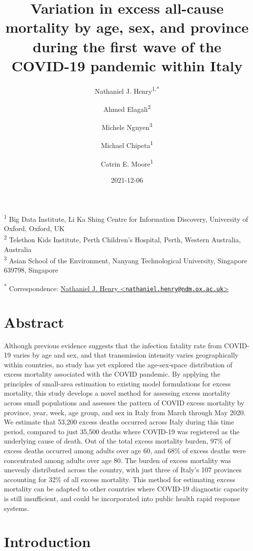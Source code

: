 \documentclass[
]{article}
\title{Variation in excess all-cause mortality by age, sex, and province during the first wave of the COVID-19 pandemic within Italy}
\author{Nathaniel J. Henry\textsuperscript{1,*} \and Ahmed Elagali\textsuperscript{2} \and Michele Nguyen\textsuperscript{3} \and Michael Chipeta\textsuperscript{1} \and Catrin E. Moore\textsuperscript{1}}
\date{2021-12-06}
\begin{document}
\maketitle

\textsuperscript{1} Big Data Institute, Li Ka Shing Centre for Information Discovery, University of Oxford, Oxford, UK\\
\textsuperscript{2} Telethon Kids Institute, Perth Children's Hospital, Perth, Western Australia, Australia\\
\textsuperscript{3} Asian School of the Environment, Nanyang Technological University, Singapore 639798, Singapore

\textsuperscript{*} Correspondence: \href{mailto:nathaniel.henry@ndm.ox.ac.uk}{Nathaniel J. Henry \textless{}\href{mailto:nathaniel.henry@ndm.ox.ac.uk}{\nolinkurl{nathaniel.henry@ndm.ox.ac.uk}}\textgreater{}}

\hypertarget{abstract}{%
\section{Abstract}\label{abstract}}

Although previous evidence suggests that the infection fatality rate from COVID-19 varies by age and sex, and that transmission intensity varies geographically within countries, no study has yet explored the age-sex-space distribution of excess mortality associated with the COVID pandemic. By applying the principles of small-area estimation to existing model formulations for excess mortality, this study develops a novel method for assessing excess mortality across small populations and assesses the pattern of COVID excess mortality by province, year, week, age group, and sex in Italy from March through May 2020. We estimate that 53,200 excess deaths occurred across Italy during this time period, compared to just 35,500 deaths where COVID-19 was registered as the underlying cause of death. Out of the total excess mortality burden, 97\% of excess deaths occurred among adults over age 60, and 68\% of excess deaths were concentrated among adults over age 80. The burden of excess mortality was unevenly distributed across the country, with just three of Italy's 107 provinces accounting for 32\% of all excess mortality. This method for estimating excess mortality can be adapted to other countries where COVID-19 diagnostic capacity is still insufficient, and could be incorporated into public health rapid response systems.

\hypertarget{introduction}{%
\section{Introduction}\label{introduction}}
\end{document}
